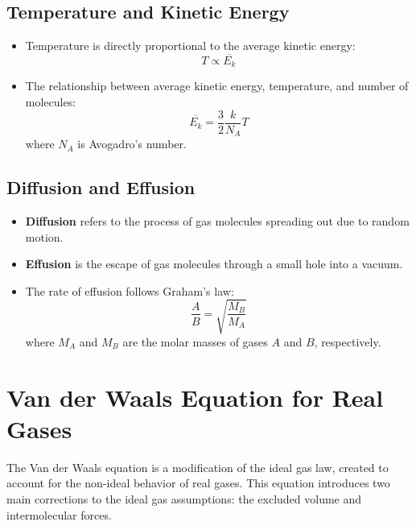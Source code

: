 \documentclass{report}
\begin{document}
\subsection{Temperature and Kinetic Energy}
\begin{itemize}
	\item Temperature is directly proportional to the average kinetic energy:
	      \[
		      T \propto \overline{E_k}
	      \]

	\item The relationship between average kinetic energy, temperature, and number of molecules:
	      \[
		      \overline{E_k} = \frac{3}{2} \frac{k}{N_A} T
	      \]
	      where $N_A$ is Avogadro's number.
\end{itemize}

\subsection{Diffusion and Effusion}
\begin{itemize}
	\item \textbf{Diffusion} refers to the process of gas molecules spreading out due to random motion.

	\item \textbf{Effusion} is the escape of gas molecules through a small hole into a vacuum.

	\item The rate of effusion follows Graham's law:
	      \[
		      \frac{A}{B} = \sqrt{\frac{M_B}{M_A}}
	      \]
	      where $M_A$ and $M_B$ are the molar masses of gases $A$ and $B$, respectively.
\end{itemize}

\section{Van der Waals Equation for Real Gases}

The Van der Waals equation is a modification of the ideal gas law, created to account for the non-ideal behavior of real gases. This equation introduces two main corrections to the ideal gas assumptions: the excluded volume and intermolecular forces.
\end{document}
